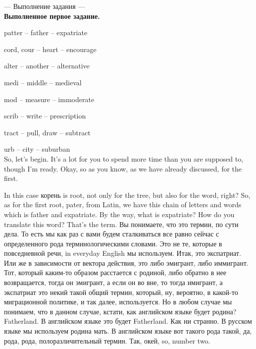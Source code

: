 \documentclass[main.tex]{subfiles}
\begin{document}
--- Выполнение задания ---
\\

\textbf{Выполненное первое задание.}

patter -- father -- expatriate

cord, cour -- heart -- encourage

alter -- another -- alternative

medi -- middle -- medieval

mod -- measure -- immoderate

scrib -- write -- prescription

tract -- pull, draw -- subtract

urb -- city -- suburban
\\

So, let's begin.
It's a lot for you to spend more time than you are supposed to, though I'm ready.
Okay, so as you know, as we have already discussed, for the first.

In this case корень is root, not only for the tree, but also for the word, right?
So, as for the first root, pater, from Latin, we have this chain of letters and words which is father and expatriate.
By the way, what is expatriate? How do you translate this word? That's the term.
Вы понимаете, что это термин, по сути дела.
То есть мы как раз с вами будем сталкиваться все равно сейчас с определенного рода терминологическими словами.
Это не те, которые в повседневной речи, in everyday English мы используем.
Итак, это экспатриат.
Или же в зависимости от вектора действия, это либо эмигрант, либо иммигрант.
Тот, который каким-то образом расстается с родиной, либо обратно в нее возвращается, тогда он эмигрант, а если он во вне, то тогда имигрант, а экспатриат это некий такой общий термин, который, ну, вероятно, в какой-то миграционной политике, и так далее, используется.
Но в любом случае мы понимаем, что в данном случае, кстати, как английском языке будет родина? Fatherland.
В английском языке это будет Fatherland.
Как ни странно.
В русском языке мы используем родина мать.
В английском языке вот такого рода такой, да, рода, рода, полоразличительный термин.
Так, окей, so, number two.
\end{document}
